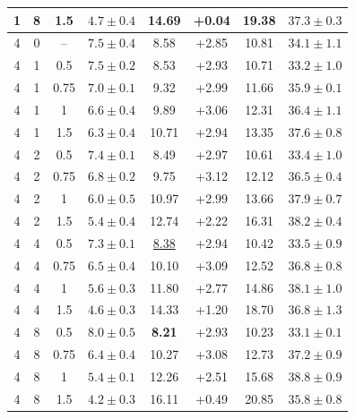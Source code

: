 \documentclass{article}
\begin{document}
\begin{table}[!htbp]
\begin{tabular}{cccccccc}
1 & 8 & 1.5 & $4.7\pm0.4$ & 14.69 & +0.04 & 19.38 & $37.3\pm0.3$\\
\midrule
4 & 0 & -- & $7.5\pm0.4$ & 8.58 & +2.85 & 10.81 & $34.1\pm1.1$\\
4 & 1 & 0.5 & $7.5\pm0.2$ & 8.53 & +2.93 & 10.71 & $33.2\pm1.0$\\
4 & 1 & 0.75 & $7.0\pm0.1$ & 9.32 & +2.99 & 11.66 & $35.9\pm0.1$\\
4 & 1 & 1 & $6.6\pm0.4$ & 9.89 & +3.06 & 12.31 & $36.4\pm1.1$\\
4 & 1 & 1.5 & $6.3\pm0.4$ & 10.71 & +2.94 & 13.35 & $37.6\pm0.8$\\
4 & 2 & 0.5 & $7.4\pm0.1$ & 8.49 & +2.97 & 10.61 & $33.4\pm1.0$\\
4 & 2 & 0.75 & $6.8\pm0.2$ & 9.75 & +3.12 & 12.12 & $36.5\pm0.4$\\
4 & 2 & 1 & $6.0\pm0.5$ & 10.97 & +2.99 & 13.66 & $37.9\pm0.7$\\
4 & 2 & 1.5 & $5.4\pm0.4$ & 12.74 & +2.22 & 16.31 & $38.2\pm0.4$\\
4 & 4 & 0.5 & $7.3\pm0.1$ & \underline{8.38}& +2.94 & 10.42 & $33.5\pm0.9$\\
4 & 4 & 0.75 & $6.5\pm0.4$ & 10.10 & +3.09 & 12.52 & $36.8\pm0.8$\\
4 & 4 & 1 & $5.6\pm0.3$ & 11.80 & +2.77 & 14.86 & $38.1\pm1.0$\\
4 & 4 & 1.5 & $4.6\pm0.3$ & 14.33 & +1.20 & 18.70 & $36.8\pm1.3$\\
4 & 8 & 0.5 & $\mathbf{8.0\pm0.5}$& \textbf{8.21}& +2.93 & 10.23 & $33.1\pm0.1$\\
4 & 8 & 0.75 & $6.4\pm0.4$ & 10.27 & +3.08 & 12.73 & $37.2\pm0.9$\\
4 & 8 & 1 & $5.4\pm0.1$ & 12.26 & +2.51 & 15.68 & $\mathbf{38.8\pm0.9}$\\
4 & 8 & 1.5 & $4.2\pm0.3$ & 16.11 & +0.49 & 20.85 & $35.8\pm0.8$\\
\bottomrule
\end{tabular}
\end{table}
\clearpage
\end{document}
